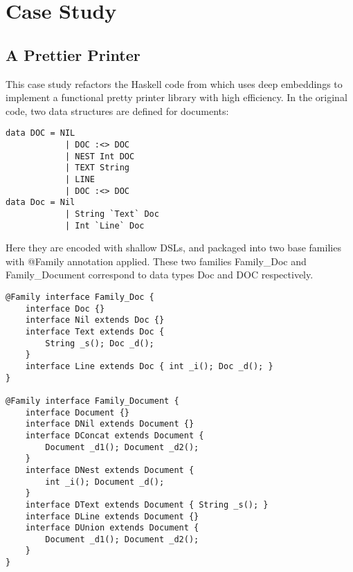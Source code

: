 \section{Case Study}\label{sec:casestudy}

\subsection{A Prettier Printer}

This case study refactors the Haskell code from \cite{Wadler98aprettier}
which uses deep embeddings to implement a functional pretty printer library with high efficiency. In the original code, two
data structures are defined for documents:
\begin{lstlisting}[keywords={data,Int,String}]
data DOC = NIL
            | DOC :<> DOC
            | NEST Int DOC
            | TEXT String
            | LINE
            | DOC :<> DOC
data Doc = Nil
            | String `Text` Doc
            | Int `Line` Doc
\end{lstlisting}
Here they are encoded with shallow DSLs, and packaged into
two base families with \textsf{@Family} annotation applied. These two families \textsf{Family\_Doc} and
\textsf{Family\_Document} correspond to data types \textsf{Doc} and \textsf{DOC} respectively.

\begin{lstlisting}
@Family interface Family_Doc {
	interface Doc {}
	interface Nil extends Doc {}
	interface Text extends Doc {
		String _s(); Doc _d();
	}
	interface Line extends Doc { int _i(); Doc _d(); }
}

@Family interface Family_Document {
	interface Document {}
	interface DNil extends Document {}
	interface DConcat extends Document {
		Document _d1(); Document _d2();
	}
	interface DNest extends Document {
		int _i(); Document _d();
	}
	interface DText extends Document { String _s(); }
	interface DLine extends Document {}
	interface DUnion extends Document {
		Document _d1(); Document _d2();
	}
}
\end{lstlisting}

